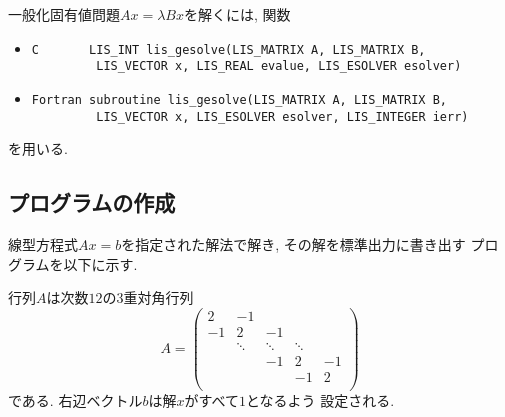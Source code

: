 \documentclass[a4paper]{jarticle}
\begin{document}
{{一般化固有値問題$Ax=\lambda Bx$を解くには, 関数
\begin{itemize}
\item \verb|C       LIS_INT lis_gesolve(LIS_MATRIX A, LIS_MATRIX B,|\\
      \verb|         LIS_VECTOR x, LIS_REAL evalue, LIS_ESOLVER esolver)|
\item \verb|Fortran subroutine lis_gesolve(LIS_MATRIX A, LIS_MATRIX B,|\\
      \verb|         LIS_VECTOR x, LIS_ESOLVER esolver, LIS_INTEGER ierr)|
\end{itemize}
を用いる. 

\subsection{プログラムの作成}
\label{sec:testprog3}
線型方程式$Ax=b$を指定された解法で解き, その解を標準出力に書き出す
プログラムを以下に示す. 

行列$A$は次数$12$の3重対角行列
\[
A = 
\left(
\begin{array}{ccccc}
2 & -1 &   &  &   \\
-1 & 2 & -1 &  &   \\
  & \ddots  & \ddots  & \ddots  &   \\
  &   & -1 & 2 & -1 \\
  &   &   & -1 & 2 \\
\end{array}
\right)
\]
である. 右辺ベクトル$b$は解$x$がすべて$1$となるよう
設定される. 

}}
\end{document}

